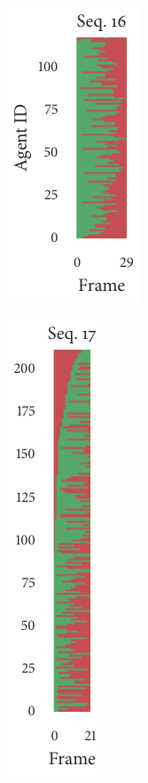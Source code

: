 \begin{figure}[t]
	\begin{subfigure}[b]{0.2\textwidth}
		\centering
		\includegraphics{missingness_sequence16.pdf}
	\end{subfigure}%
	\begin{subfigure}[b]{0.2\textwidth}
		\centering
		\includegraphics{missingness_sequence17.pdf}
	\end{subfigure}%
	\begin{subfigure}[b]{0.2\textwidth}
		\centering

\end{subfigure}
\end{figure}
